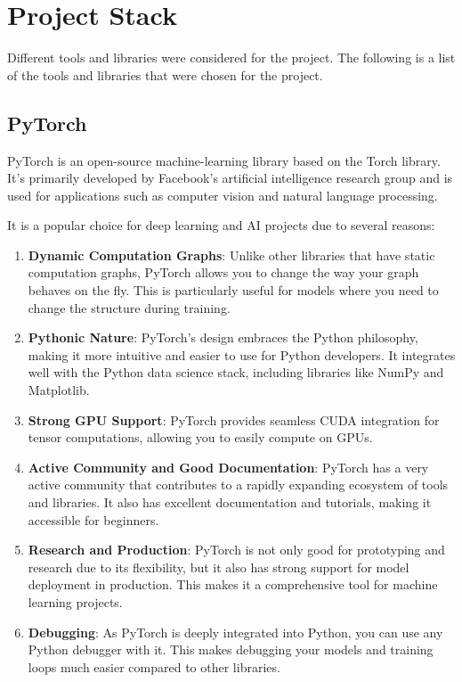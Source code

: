 \section{Project Stack}
Different tools and libraries were considered for the project. The following is a list of the tools and libraries that were chosen for the project.

\subsection{PyTorch}
PyTorch is an open-source machine-learning library based on the Torch library. It's primarily developed by Facebook's artificial intelligence research group and is used for applications such as computer vision and natural language processing.

It is a popular choice for deep learning and AI projects due to several reasons:
\begin{enumerate}
    \item \textbf{Dynamic Computation Graphs}: Unlike other libraries that have static computation graphs, PyTorch allows you to change the way your graph behaves on the fly. This is particularly useful for models where you need to change the structure during training.
    \item \textbf{Pythonic Nature}: PyTorch's design embraces the Python philosophy, making it more intuitive and easier to use for Python developers. It integrates well with the Python data science stack, including libraries like NumPy and Matplotlib.
    \item \textbf{Strong GPU Support}: PyTorch provides seamless CUDA integration for tensor computations, allowing you to easily compute on GPUs.
    \item \textbf{Active Community and Good Documentation}: PyTorch has a very active community that contributes to a rapidly expanding ecosystem of tools and libraries. It also has excellent documentation and tutorials, making it accessible for beginners.
    \item \textbf{Research and Production}: PyTorch is not only good for prototyping and research due to its flexibility, but it also has strong support for model deployment in production. This makes it a comprehensive tool for machine learning projects.
    \item \textbf{Debugging}: As PyTorch is deeply integrated into Python, you can use any Python debugger with it. This makes debugging your models and training loops much easier compared to other libraries.
\end{enumerate}

